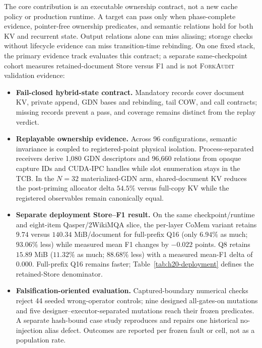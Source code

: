 \documentclass{article}
\newcommand{\method}{\textsc{ForkAudit}}
\begin{document}
The core contribution is an executable ownership contract, not a new cache
policy or production runtime.  A target can pass only when phase-complete evidence,
pointer-free ownership predicates, and semantic relations hold for both KV and
recurrent state.  Output relations alone can miss aliasing; storage checks
without lifecycle evidence can miss transition-time rebinding.  On one fixed
stack, the primary evidence track evaluates this contract; a separate
same-checkpoint cohort measures retained-document Store versus F1 and is not
\method{} validation evidence:
\begin{itemize}
  \setlength{\itemsep}{1pt}
  \setlength{\parskip}{0pt}
  \item \textbf{Fail-closed hybrid-state contract.} Mandatory records cover
  document KV, private append, GDN bases and rebinding, tail COW, and call
  contracts; missing records prevent a pass, and coverage remains distinct
  from the replay verdict.
  \item \textbf{Replayable ownership evidence.} Across 96 configurations,
  semantic invariance is coupled to registered-point physical isolation.
  Process-separated receivers derive 1,080 GDN descriptors and 96,660 relations
  from opaque capture IDs and CUDA-IPC handles while slot enumeration stays in
  the TCB.  In the $N=32$ materialized-GDN arm, shared-document KV reduces the
  post-priming allocator delta $54.5\%$ versus full-copy KV while the registered
  observables remain canonically equal.
  \item \textbf{Separate deployment Store--F1 result.} On the same
  checkpoint/runtime and eight-item Qasper/2WikiMQA slice, the per-layer CoMem
  variant retains $9.74$ versus $140.34$ MiB/document for full-prefix Q16
  (only $6.94\%$ as much; $93.06\%$ less) while measured mean F1 changes by
  $-0.022$ points.  Q8 retains $15.89$ MiB ($11.32\%$ as much; $88.68\%$ less)
  with a measured mean-F1 delta of $0.000$.  Full-prefix Q16 remains faster;
  Table~\ref{tab:h20-deployment} defines the retained-Store denominator.
  \item \textbf{Falsification-oriented evaluation.} Captured-boundary numerical
  checks reject 44 seeded wrong-operator controls; nine designed all-gates-on
  mutations and five designer--executor-separated mutations reach their frozen
  predicates.  A separate hash-bound case study reproduces and repairs one
  historical no-injection alias defect.  Outcomes are reported per frozen fault
  or cell, not as a population rate.
\end{itemize}
\end{document}
